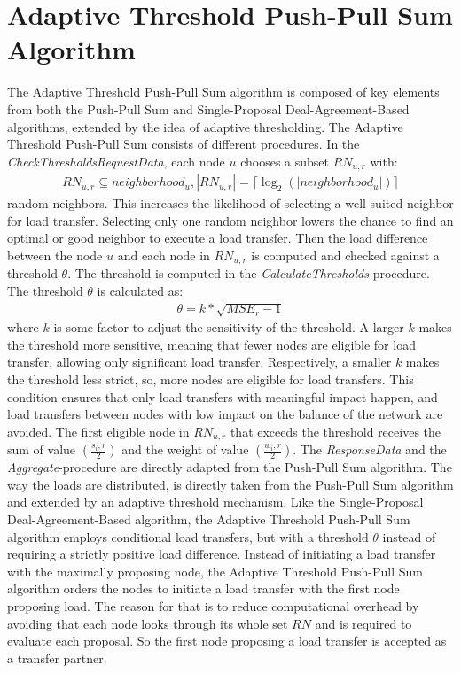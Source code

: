 \section{Adaptive Threshold Push-Pull Sum Algorithm}\label{sec:adaptivethresholdPPS}
The Adaptive Threshold Push-Pull Sum algorithm is composed of key elements from both the Push-Pull Sum and Single-Proposal Deal-Agreement-Based algorithms, extended by the idea of adaptive thresholding. The Adaptive Threshold Push-Pull Sum consists of different procedures. In the \textit{CheckThresholdsRequestData}, each node $u$ chooses a subset $RN_{u,r}$ with:
\begin{align}
    RN_{u,r} \subseteq neighborhood_{u}, |RN_{u,r}|=\lceil \log_{2}{(|neighborhood_{u}|)} \rceil
\end{align}
random neighbors. This increases the likelihood of selecting a well-suited neighbor for load transfer. Selecting only one random neighbor lowers the chance to find an optimal or good neighbor to execute a load transfer. Then the load difference between the node $u$ and each node in $RN_{u,r}$ is computed and checked against a threshold $\theta$. The threshold is computed in the \textit{CalculateThresholds}-procedure. The threshold $\theta$ is calculated as:
\begin{align}
    \theta = k*\sqrt{MSE_r-1}    
\end{align}
where $k$ is some factor to adjust the sensitivity of the threshold. A larger $k$ makes the threshold more sensitive, meaning that fewer nodes are eligible for load transfer, allowing only significant load transfer. Respectively, a smaller $k$ makes the threshold less strict, so, more nodes are eligible for load transfers. This condition ensures that only load transfers with meaningful impact happen, and load transfers between nodes with low impact on the balance of the network are avoided. The first eligible node in $RN_{u,r}$ that exceeds the threshold receives the sum of value $(\frac{s_i,r}{2})$ and the weight of value $(\frac{w_i,r}{2})$. The \textit{ResponseData} and the \textit{Aggregate}-procedure are directly adapted from the Push-Pull Sum algorithm. The way the loads are distributed, is directly taken from the Push-Pull Sum algorithm and extended by an adaptive threshold mechanism. Like the Single-Proposal Deal-Agreement-Based algorithm, the Adaptive Threshold Push-Pull Sum algorithm employs conditional load transfers, but with a threshold $\theta$ instead of requiring a strictly positive load difference. Instead of initiating a load transfer with the maximally proposing node, the Adaptive Threshold Push-Pull Sum algorithm orders the nodes to initiate a load transfer with the first node proposing load. The reason for that is to reduce computational overhead by avoiding that each node looks through its whole set $RN$ and is required to evaluate each proposal. So the first node proposing a load transfer is accepted as a transfer partner.

